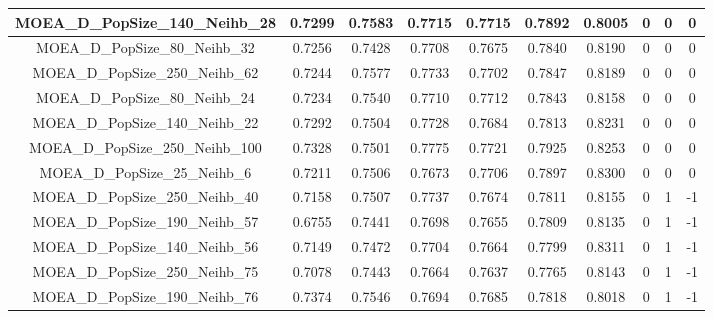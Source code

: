 \begin{table}[!h]
{\begin{tabular}{|c|c|c|c|c|c|c|c|c|c|}
MOEA\_D\_PopSize\_140\_Neihb\_28  & 0.7299        & 0.7583           & 0.7715          & 0.7715        & 0.7892           & 0.8005        & 0          & 0          & 0                \\ \hline
MOEA\_D\_PopSize\_80\_Neihb\_32   & 0.7256        & 0.7428           & 0.7708          & 0.7675        & 0.7840           & 0.8190        & 0          & 0          & 0                \\ \hline
MOEA\_D\_PopSize\_250\_Neihb\_62  & 0.7244        & 0.7577           & 0.7733          & 0.7702        & 0.7847           & 0.8189        & 0          & 0          & 0                \\ \hline
MOEA\_D\_PopSize\_80\_Neihb\_24   & 0.7234        & 0.7540           & 0.7710          & 0.7712        & 0.7843           & 0.8158        & 0          & 0          & 0                \\ \hline
MOEA\_D\_PopSize\_140\_Neihb\_22  & 0.7292        & 0.7504           & 0.7728          & 0.7684        & 0.7813           & 0.8231        & 0          & 0          & 0                \\ \hline
MOEA\_D\_PopSize\_250\_Neihb\_100 & 0.7328        & 0.7501           & 0.7775          & 0.7721        & 0.7925           & 0.8253        & 0          & 0          & 0                \\ \hline
MOEA\_D\_PopSize\_25\_Neihb\_6    & 0.7211        & 0.7506           & 0.7673          & 0.7706        & 0.7897           & 0.8300        & 0          & 0          & 0                \\ \hline
MOEA\_D\_PopSize\_250\_Neihb\_40  & 0.7158        & 0.7507           & 0.7737          & 0.7674        & 0.7811           & 0.8155        & 0          & 1          & -1               \\ \hline
MOEA\_D\_PopSize\_190\_Neihb\_57  & 0.6755        & 0.7441           & 0.7698          & 0.7655        & 0.7809           & 0.8135        & 0          & 1          & -1               \\ \hline
MOEA\_D\_PopSize\_140\_Neihb\_56  & 0.7149        & 0.7472           & 0.7704          & 0.7664        & 0.7799           & 0.8311        & 0          & 1          & -1               \\ \hline
MOEA\_D\_PopSize\_250\_Neihb\_75  & 0.7078        & 0.7443           & 0.7664          & 0.7637        & 0.7765           & 0.8143        & 0          & 1          & -1               \\ \hline
MOEA\_D\_PopSize\_190\_Neihb\_76  & 0.7374        & 0.7546           & 0.7694          & 0.7685        & 0.7818           & 0.8018        & 0          & 1          & -1               \\ \hline

\end{tabular}}
\end{table}
